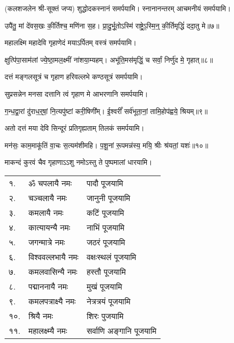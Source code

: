 \begin{center}
(कलशजलेन श्री-सूक्तं जप्य) शुद्धोदकस्नानं समर्पयामि।
स्नानानन्तरम् आचमनीयं समर्पयामि।\medskip

उपै॑तु॒ मां दे॑वस॒खः की॒र्तिश्च॒ मणि॑ना स॒ह।
प्रा॒दु॒र्भू॒तोऽस्मि॑ राष्ट्रे॒ऽ॒स्मि॒न्॒ की॒र्तिमृद्धिं॑ ददा॒तु मे॥७॥


{महालक्ष्मि महादेवि गृहाणेदं मयाऽर्पितम्}
 वस्त्रं समर्पयामि।\medskip

 क्षुत्पि॑पा॒साम॑लां ज्ये॒ष्ठा॒मल॒क्ष्मीं ना॑शया॒म्यहम्।
अभू॑ति॒\-मस॑मृद्धिं॒ च सर्वां॒ निर्णु॑द मे॒ गृहात्॥८॥


{दत्तं मङ्गलसूत्रं च गृहाण हरिवल्लभे}
कण्ठसूत्रं समर्पयामि।\medskip


{सुप्रसन्नेन मनसा दत्तानि त्वं गृहाण मे}
आभरणानि समर्पयामि।\medskip


ग॒न्ध॒द्वा॒रां दु॑राध॒र्॒‌षां॒ नि॒त्यपु॑ष्टां करी॒षिणी᳚म्।
ई॒श्वरीं᳚ सर्व॑भूता॒नां॒ तामि॒होप॑ह्वये॒ श्रियम्॥९॥

{अतो दत्तं मया देवि सिन्दूरं प्रतिगृह्यताम्}
 तिलकं समर्पयामि। \medskip


मन॑सः॒ काम॒माकू॑तिं वा॒चः स॒त्यम॑शीमहि।
प॒शू॒नां रू॒पमन्न॑स्य॒ मयि॒ श्रीः श्र॑यतां॒ यशः॑॥१०॥

{माकन्दं कुरवं चैव गृहाणाऽऽशु नमोऽस्तु ते}
  पुष्पमालां धारयामि। 
\end{center}
\begin{longtable}{ll@{— }l}
१.& ॐ चपलायै नमः & पादौ पूजयामि \\
२.& चञ्चलायै नमः & जानुनी पूजयामि\\
३.& कमलायै नमः & कटिं पूजयामि  \\
४.& कात्यायन्यै नमः & नाभिं पूजयामि\\
५.& जगन्मात्रे नमः & जठरं पूजयामि   \\
६.& विश्ववल्लभायै नमः & वक्षःस्थलं पूजयामि \\
७.& कमलवासिन्यै नमः & हस्तौ पूजयामि        \\
८.& पद्माननायै नमः & मुखं पूजयामि\\
९.& कमलपत्राक्ष्यै नमः & नेत्रत्रयं पूजयामि    \\
१०.& श्रियै नमः & शिरः पुजयामि\\
११.& महालक्ष्म्यै नमः & सर्वाणि अङ्गानि पूजयामि   \\
\end{longtable}

